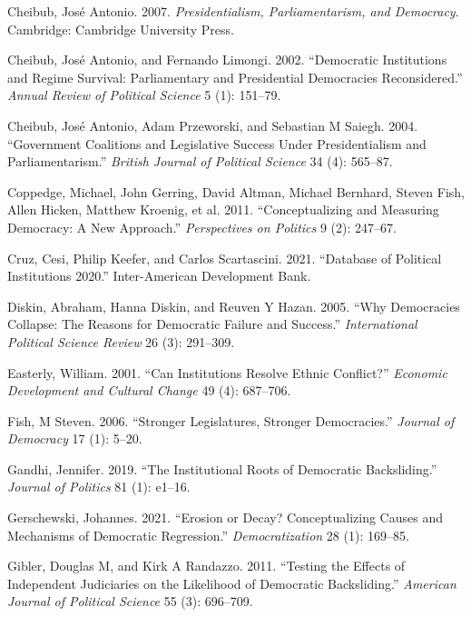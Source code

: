 \documentclass[
  letterpaper,
  DIV=11,
  numbers=noendperiod]{scrartcl}
\newlength{\cslhangindent}
\newenvironment{CSLReferences}[2] %
 {\begin{list}{}{%
  \setlength{\itemindent}{0pt}
  \setlength{\leftmargin}{0pt}
  \setlength{\parsep}{0pt}
  \ifodd #1
   \setlength{\leftmargin}{\cslhangindent}
   \setlength{\itemindent}{-1\cslhangindent}
  \fi
  \setlength{\itemsep}{#2\baselineskip}}}
 {\end{list}}
\begin{document}
\begin{CSLReferences}{1}{0}
Cheibub, José Antonio. 2007. \emph{Presidentialism, Parliamentarism, and
Democracy}. Cambridge: Cambridge University Press.

Cheibub, José Antonio, and Fernando Limongi. 2002. {``Democratic
Institutions and Regime Survival: Parliamentary and Presidential
Democracies Reconsidered.''} \emph{Annual Review of Political Science} 5
(1): 151--79.

Cheibub, José Antonio, Adam Przeworski, and Sebastian M Saiegh. 2004.
{``Government Coalitions and Legislative Success Under Presidentialism
and Parliamentarism.''} \emph{British Journal of Political Science} 34
(4): 565--87.

Coppedge, Michael, John Gerring, David Altman, Michael Bernhard, Steven
Fish, Allen Hicken, Matthew Kroenig, et al. 2011. {``Conceptualizing and
Measuring Democracy: A New Approach.''} \emph{Perspectives on Politics}
9 (2): 247--67.

Cruz, Cesi, Philip Keefer, and Carlos Scartascini. 2021. {``Database of
Political Institutions 2020.''} Inter-American Development Bank.

Diskin, Abraham, Hanna Diskin, and Reuven Y Hazan. 2005. {``Why
Democracies Collapse: The Reasons for Democratic Failure and Success.''}
\emph{International Political Science Review} 26 (3): 291--309.

Easterly, William. 2001. {``Can Institutions Resolve Ethnic Conflict?''}
\emph{Economic Development and Cultural Change} 49 (4): 687--706.

Fish, M Steven. 2006. {``Stronger Legislatures, Stronger Democracies.''}
\emph{Journal of Democracy} 17 (1): 5--20.

Gandhi, Jennifer. 2019. {``The Institutional Roots of Democratic
Backsliding.''} \emph{Journal of Politics} 81 (1): e1--16.

Gerschewski, Johannes. 2021. {``Erosion or Decay? Conceptualizing Causes
and Mechanisms of Democratic Regression.''} \emph{Democratization} 28
(1): 169--85.

Gibler, Douglas M, and Kirk A Randazzo. 2011. {``Testing the Effects of
Independent Judiciaries on the Likelihood of Democratic Backsliding.''}
\emph{American Journal of Political Science} 55 (3): 696--709.


\end{CSLReferences}
\end{document}
